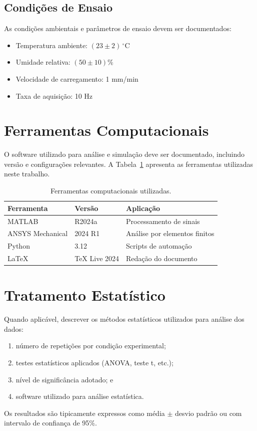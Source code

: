 \subsection{Condições de Ensaio}

As condições ambientais e parâmetros de ensaio devem ser documentados:
\begin{itemize}
    \item Temperatura ambiente: $(23 \pm 2)\,^{\circ}$C
    \item Umidade relativa: $(50 \pm 10)$\%
    \item Velocidade de carregamento: 1 mm/min
    \item Taxa de aquisição: 10 Hz
\end{itemize}

\section{Ferramentas Computacionais}

O software utilizado para análise e simulação deve ser documentado, incluindo versão e configurações relevantes. A Tabela~\ref{tab:software} apresenta as ferramentas utilizadas neste trabalho.

\begin{table}[ht]
\centering
\caption{Ferramentas computacionais utilizadas.}
\label{tab:software}
\begin{tabular}{lll}
\toprule
Ferramenta & Versão & Aplicação \\
\midrule
MATLAB & R2024a & Processamento de sinais \\
ANSYS Mechanical & 2024 R1 & Análise por elementos finitos \\
Python & 3.12 & Scripts de automação \\
\LaTeX{} & TeX Live 2024 & Redação do documento \\
\bottomrule
\end{tabular}
\end{table}

\section{Tratamento Estatístico}

Quando aplicável, descrever os métodos estatísticos utilizados para análise dos dados:

\begin{enumerate}
    \item número de repetições por condição experimental;
    \item testes estatísticos aplicados (ANOVA, teste t, etc.);
    \item nível de significância adotado; e
    \item software utilizado para análise estatística.
\end{enumerate}

Os resultados são tipicamente expressos como média $\pm$ desvio padrão ou com intervalo de confiança de 95\%.
